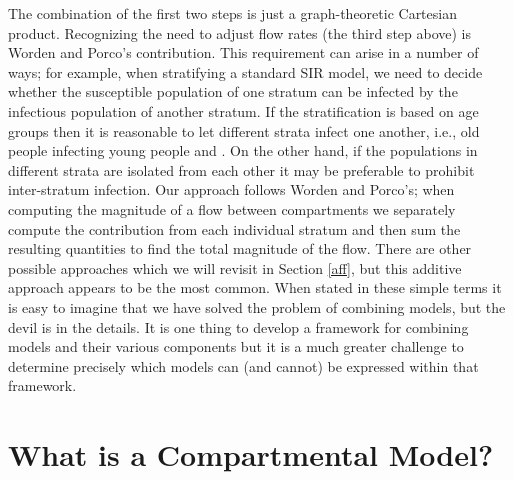 The combination of the first two steps is just a graph-theoretic Cartesian product. Recognizing the need to adjust flow rates (the third step above) is Worden and Porco's contribution. This requirement can arise in a number of ways; for example, when stratifying a standard SIR model, we need to decide whether the susceptible population of one stratum can be infected by the infectious population of another stratum.
If the stratification is based on age groups then it is reasonable to let different strata infect one another, i.e., old people infecting young people and \vv. 
On the other hand, if the populations in different strata are isolated from each other it may be preferable to prohibit inter-stratum infection. Our approach follows Worden and Porco's; when computing the magnitude of a flow between compartments we separately compute the contribution from each individual stratum and then sum the resulting quantities to find the total magnitude of the flow. There are other possible approaches which we will revisit in Section \ref{aff}, but this additive approach appears to be the most common. When stated in these simple terms it is easy to imagine that we have solved the problem of combining models, but the devil is in the details.  It is one thing to develop a framework for combining models and their various components but it is a much greater challenge to determine precisely which models can (and cannot) be expressed within that framework. 



\section{What is a Compartmental Model?}\label{dcm}

